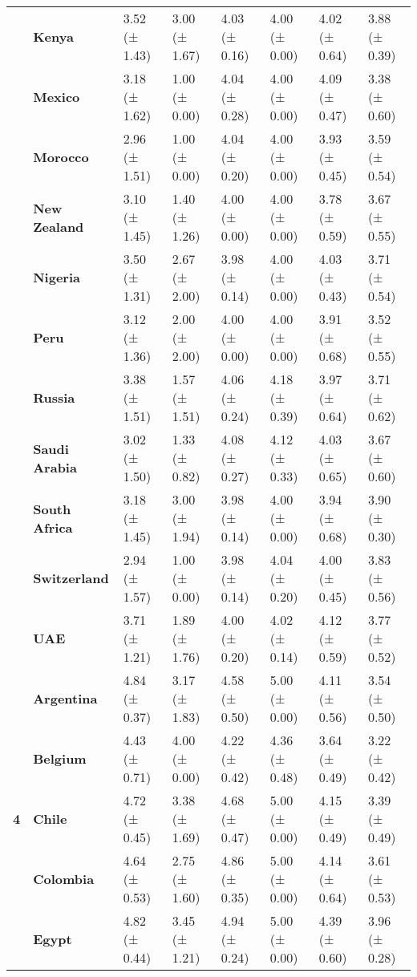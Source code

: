 \begin{tabular}{llllllll}
\textbf{} & \textbf{Kenya} & 3.52 (± 1.43) & 3.00 (± 1.67) & 4.03 (± 0.16) & 4.00 (± 0.00) & 4.02 (± 0.64) & 3.88 (± 0.39) \\
\textbf{} & \textbf{Mexico} & 3.18 (± 1.62) & 1.00 (± 0.00) & 4.04 (± 0.28) & 4.00 (± 0.00) & 4.09 (± 0.47) & 3.38 (± 0.60) \\
\textbf{} & \textbf{Morocco} & 2.96 (± 1.51) & 1.00 (± 0.00) & 4.04 (± 0.20) & 4.00 (± 0.00) & 3.93 (± 0.45) & 3.59 (± 0.54) \\
\textbf{} & \textbf{New Zealand} & 3.10 (± 1.45) & 1.40 (± 1.26) & 4.00 (± 0.00) & 4.00 (± 0.00) & 3.78 (± 0.59) & 3.67 (± 0.55) \\
\textbf{} & \textbf{Nigeria} & 3.50 (± 1.31) & 2.67 (± 2.00) & 3.98 (± 0.14) & 4.00 (± 0.00) & 4.03 (± 0.43) & 3.71 (± 0.54) \\
\textbf{} & \textbf{Peru} & 3.12 (± 1.36) & 2.00 (± 2.00) & 4.00 (± 0.00) & 4.00 (± 0.00) & 3.91 (± 0.68) & 3.52 (± 0.55) \\
\textbf{} & \textbf{Russia} & 3.38 (± 1.51) & 1.57 (± 1.51) & 4.06 (± 0.24) & 4.18 (± 0.39) & 3.97 (± 0.64) & 3.71 (± 0.62) \\
\textbf{} & \textbf{Saudi Arabia} & 3.02 (± 1.50) & 1.33 (± 0.82) & 4.08 (± 0.27) & 4.12 (± 0.33) & 4.03 (± 0.65) & 3.67 (± 0.60) \\
\textbf{} & \textbf{South Africa} & 3.18 (± 1.45) & 3.00 (± 1.94) & 3.98 (± 0.14) & 4.00 (± 0.00) & 3.94 (± 0.68) & 3.90 (± 0.30) \\
\textbf{} & \textbf{Switzerland} & 2.94 (± 1.57) & 1.00 (± 0.00) & 3.98 (± 0.14) & 4.04 (± 0.20) & 4.00 (± 0.45) & 3.83 (± 0.56) \\
\textbf{} & \textbf{UAE} & 3.71 (± 1.21) & 1.89 (± 1.76) & 4.00 (± 0.20) & 4.02 (± 0.14) & 4.12 (± 0.59) & 3.77 (± 0.52) \\
\cline{1-8}
\multirow[t]{19}{*}{\textbf{4}} & \textbf{Argentina} & 4.84 (± 0.37) & 3.17 (± 1.83) & 4.58 (± 0.50) & 5.00 (± 0.00) & 4.11 (± 0.56) & 3.54 (± 0.50) \\
\textbf{} & \textbf{Belgium} & 4.43 (± 0.71) & 4.00 (± 0.00) & 4.22 (± 0.42) & 4.36 (± 0.48) & 3.64 (± 0.49) & 3.22 (± 0.42) \\
\textbf{} & \textbf{Chile} & 4.72 (± 0.45) & 3.38 (± 1.69) & 4.68 (± 0.47) & 5.00 (± 0.00) & 4.15 (± 0.49) & 3.39 (± 0.49) \\
\textbf{} & \textbf{Colombia} & 4.64 (± 0.53) & 2.75 (± 1.60) & 4.86 (± 0.35) & 5.00 (± 0.00) & 4.14 (± 0.64) & 3.61 (± 0.53) \\
\textbf{} & \textbf{Egypt} & 4.82 (± 0.44) & 3.45 (± 1.21) & 4.94 (± 0.24) & 5.00 (± 0.00) & 4.39 (± 0.60) & 3.96 (± 0.28) \\

\end{tabular}
